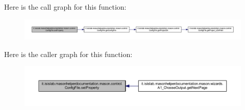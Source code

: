 Here is the call graph for this function\-:\nopagebreak
\begin{figure}[H]
\begin{center}
\leavevmode
\includegraphics[width=350pt]{classit_1_1isislab_1_1masonhelperdocumentation_1_1mason_1_1control_1_1_config_file_a29d4bd9c148d1d7576cef7bcaf796172_cgraph}
\end{center}
\end{figure}




Here is the caller graph for this function\-:\nopagebreak
\begin{figure}[H]
\begin{center}
\leavevmode
\includegraphics[width=350pt]{classit_1_1isislab_1_1masonhelperdocumentation_1_1mason_1_1control_1_1_config_file_a29d4bd9c148d1d7576cef7bcaf796172_icgraph}
\end{center}
\end{figure}




